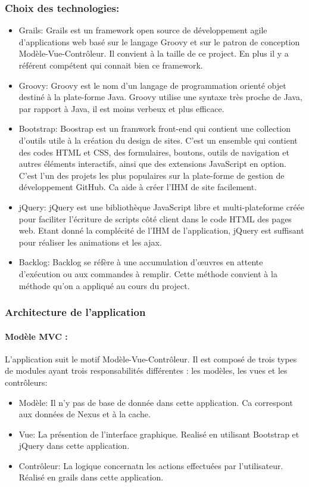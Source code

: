 \subsubsection*{Choix des technologies:}
\begin{itemize}
  \item Grails:
  Grails est un framework open source de développement agile d'applications web basé sur le langage Groovy et sur le patron de conception Modèle-Vue-Contrôleur.
  Il convient à la taille de ce project. En plus il y a référent compétent qui connait bien ce framework.
  \item Groovy:
  Groovy est le nom d'un langage de programmation orienté objet destiné à la plate-forme Java.
  Groovy utilise une syntaxe très proche de Java, par rapport à Java, il est moins verbeux et plus efficace.
  \item Bootstrap:
  Boostrap est un framwork front-end qui contient  une collection d'outils utile à la création du design de sites. C'est un ensemble qui contient des codes HTML et CSS, des formulaires, boutons, outils de navigation et autres éléments interactifs, ainsi que des extensions JavaScript en option. C'est l'un des projets les plus populaires sur la plate-forme de gestion de développement GitHub.
  Ca aide à créer l'IHM de site facilement.
  \item jQuery:
  jQuery est une bibliothèque JavaScript libre et multi-plateforme créée pour faciliter l'écriture de scripts côté client dans le code HTML des pages web.
   Etant donné la complécité de l'IHM de l'application, jQuery est suffisant pour réaliser les animations et les ajax.
  \item Backlog:
  Backlog se réfère à une accumulation d'œuvres en attente d'exécution ou aux commandes à remplir.
  Cette méthode convient à la méthode qu'on a appliqué au cours du project.
\end{itemize}


\subsubsection*{Architecture de l'application}
\paragraph{Modèle MVC :} L'application suit le motif Modèle-Vue-Contrôleur. Il est composé de  trois types de modules ayant trois responsabilités différentes : les modèles, les vues et les contrôleurs:
\begin{itemize}
  \item Modèle: Il n'y pas de base de donnée dans cette application. Ca correspont aux données de Nexus et à la cache.
  \item Vue: La présention de l'interface graphique. Realisé en utilisant Bootstrap et jQuery dans cette application.
  \item Contrôleur: La logique concernatn les actions effectuées par l'utilisateur. Réalisé en grails dans cette application.
\end{itemize}

